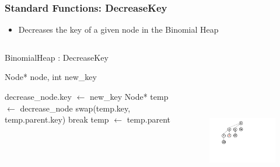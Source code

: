 \documentclass[13pt]{beamer}
\begin{document}
\begin{frame}
\frametitle{Standard Functions: DecreaseKey}
  \begin{itemize}
    \item Decreases the key of a given node in the Binomial Heap
  \end{itemize}

  \begin{columns}[T] %
    \begin{column}[T]{6cm} %
        \begin{algorithm}[H]
        \small
        \caption{BinomialHeap : DecreaseKey}
        \begin{algorithmic}
          \REQUIRE Node* node, int new\_key

          \STATE decrease\_node.key $\leftarrow$ new\_key
          \STATE Node* temp $\leftarrow$ decrease\_node
                \STATE swap(temp.key, temp.parent.key)
              \ELSE
                \STATE break
              \ENDIF
              \STATE temp $\leftarrow$ temp.parent
          \ENDWHILE
        \end{algorithmic}
        \end{algorithm}
    \end{column}
    \begin{column}[T]{7.5cm} %
      \begin{figure}
        \includegraphics[height=8cm]{./img/decreasekeyB.png}
      \end{figure}
    \end{column}
  \end{columns}

\end{frame}
\end{document}
